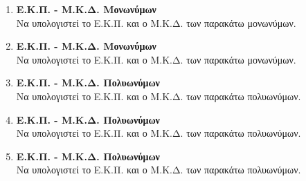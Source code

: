 \documentclass[twoside,nofonts,internet]{askhseis}
\begin{document}
\begin{multicols*}{2}
\begin{enumerate}
\item \textbf{Ε.Κ.Π. - Μ.Κ.Δ. Μονωνύμων}\\
Να υπολογιστεί το Ε.Κ.Π. και ο Μ.Κ.Δ. των παρακάτω μονωνύμων.
\item \textbf{Ε.Κ.Π. - Μ.Κ.Δ. Μονωνύμων}\\
Να υπολογιστεί το Ε.Κ.Π. και ο Μ.Κ.Δ. των παρακάτω μονωνύμων.
\item \textbf{Ε.Κ.Π. - Μ.Κ.Δ. Πολυωνύμων}\\
Να υπολογιστεί το Ε.Κ.Π. και ο Μ.Κ.Δ. των παρακάτω πολυωνύμων.
\item \textbf{Ε.Κ.Π. - Μ.Κ.Δ. Πολυωνύμων}\\
Να υπολογιστεί το Ε.Κ.Π. και ο Μ.Κ.Δ. των παρακάτω πολυωνύμων.
\item \textbf{Ε.Κ.Π. - Μ.Κ.Δ. Πολυωνύμων}\\
Να υπολογιστεί το Ε.Κ.Π. και ο Μ.Κ.Δ. των παρακάτω πολυωνύμων.
\end{enumerate}
\end{multicols*}
\end{document}
